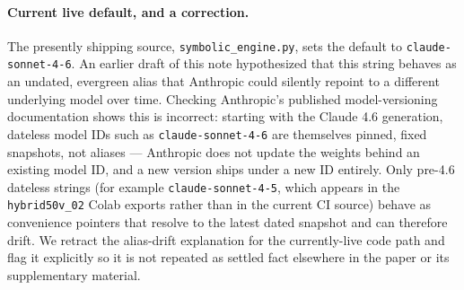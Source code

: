 \documentclass[11pt]{article}
\begin{document}
\paragraph{Current live default, and a correction.} The presently shipping
source, \texttt{symbolic\_engine.py}, sets the default to
\texttt{claude-sonnet-4-6}. An earlier draft of this note hypothesized that
this string behaves as an undated, evergreen alias that Anthropic could
silently repoint to a different underlying model over time. Checking
Anthropic's published model-versioning documentation shows this is
incorrect: starting with the Claude 4.6 generation, dateless model IDs such
as \texttt{claude-sonnet-4-6} are themselves pinned, fixed snapshots, not
aliases --- Anthropic does not update the weights behind an existing model
ID, and a new version ships under a new ID entirely. Only pre-4.6 dateless
strings (for example \texttt{claude-sonnet-4-5}, which appears in the
\texttt{hybrid50v\_02} Colab exports rather than in the current CI source)
behave as convenience pointers that resolve to the latest dated snapshot
and can therefore drift. We retract the alias-drift explanation for the
currently-live code path and flag it explicitly so it is not repeated as
settled fact elsewhere in the paper or its supplementary material.
\end{document}
